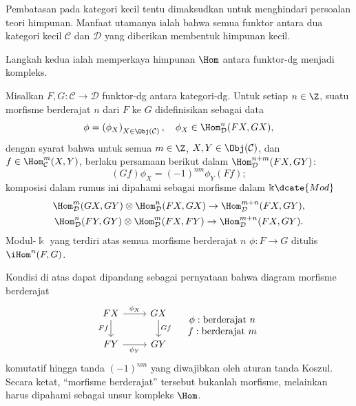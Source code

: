 Pembatasan pada kategori kecil tentu dimaksudkan untuk menghindari persoalan
teori himpunan. Manfaat utamanya ialah bahwa semua funktor antara dua kategori
kecil $\mathcal{C}$ dan $\mathcal{D}$ yang diberikan membentuk himpunan kecil.

Langkah kedua ialah memperkaya himpunan $\Hom$ antara funktor-dg menjadi
kompleks.

\begin{definition}
	Misalkan $F,G:\mathcal{C}\to\mathcal{D}$ funktor-dg antara kategori-dg.
	Untuk setiap $n\in\Z$, suatu morfisme berderajat $n$ dari $F$ ke $G$
	didefinisikan sebagai data
	\[ \phi = \left( \phi_X \right)_{X \in \Obj(\mathcal{C})}, \quad \phi_X \in \Hom_{\mathcal{D}}^n(FX, GX), \]
	dengan syarat bahwa untuk semua $m\in\Z$, $X,Y\in\Obj(\mathcal{C})$, dan
	$f\in\Hom^m_{\mathcal{C}}(X,Y)$, berlaku persamaan berikut dalam
	$\Hom^{n+m}_{\mathcal{D}}(FX,GY)$:
	\[ (Gf) \phi_X = (-1)^{nm} \phi_Y (Ff); \]
	komposisi dalam rumus ini dipahami sebagai morfisme dalam
	$\Bbbk\dcate{Mod}$
	\begin{gather*}
		\Hom^m_{\mathcal{D}}(GX, GY) \otimes \Hom^n_{\mathcal{D}}(FX, GX) \to \Hom^{m+n}_{\mathcal{D}}(FX, GY), \\
		\Hom^n_{\mathcal{D}}(FY, GY) \otimes \Hom^m_{\mathcal{D}}(FX, FY) \to \Hom^{m+n}_{\mathcal{D}}(FX, GY).
	\end{gather*}
	Modul-$\Bbbk$ yang terdiri atas semua morfisme berderajat $n$
	$\phi:F\to G$ ditulis $\iHom^n(F,G)$.
\end{definition}

Kondisi di atas dapat dipandang sebagai pernyataan bahwa diagram morfisme
berderajat
\[\begin{tikzcd}
	FX \arrow[r, "{\phi_X}"] \arrow[d, "Ff"'] & GX \arrow[d, "Gf"] \\
	FY \arrow[r, "{\phi_Y}"'] & GY
\end{tikzcd} \quad
\begin{array}{cc}
	\phi: \text{berderajat }n \\
	f: \text{berderajat }m
\end{array}\]
komutatif hingga tanda $(-1)^{nm}$ yang diwajibkan oleh aturan tanda Koszul.
Secara ketat, ``morfisme berderajat'' tersebut bukanlah morfisme, melainkan
harus dipahami sebagai unsur kompleks $\Hom$.


